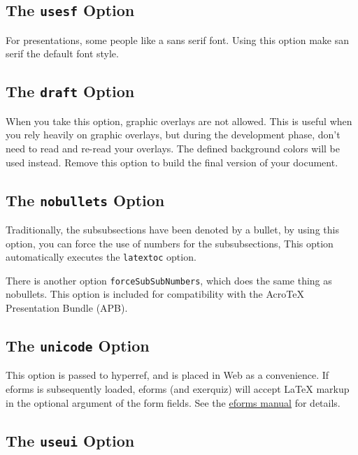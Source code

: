 \documentclass{article}
\def\AcroT{Acro\!\TeX}\def\cAcroT{\textcolor{blue}{\AcroT}}
\def\Web{\textsf{Web}}
\begin{document}
\subsection{The \texttt{usesf} Option}\label{usesf}

For presentations, some people like a sans serif font. Using this option
make san serif the default font style.

\subsection{The \texttt{draft} Option}\label{draft}

When you take this option, graphic overlays are not allowed.  This
is useful when you rely heavily on graphic overlays, but during the
development phase, don't need to read and re-read your overlays. The
defined background colors will be used instead. Remove this option
to build the final version of your document.


\subsection{The \texttt{nobullets} Option}\label{nobullets}

Traditionally, the subsubsections have been denoted by a bullet, by
using this option, you can force the use of numbers for the
subsubsections, This option automatically executes the
\texttt{latextoc} option.

There is another option \texttt{forceSubSubNumbers}, which does the same thing
as nobullets. This option is included for compatibility with the {\AcroT}
Presentation Bundle (\textsf{APB}).

\subsection{The \texttt{unicode} Option}\label{web:unicode}

This option is passed to \textsf{hyperref}, and is placed in {\Web} as a
convenience. If \textsf{eforms} is subsequently loaded, \textsf{eforms} (and
\textsf{exerquiz}) will accept {\LaTeX} markup in the optional argument
of the form fields. See the \href{eformman.pdf}{eforms manual}
for details.

\subsection{The \texttt{useui} Option}\label{web:useui}
\end{document}
